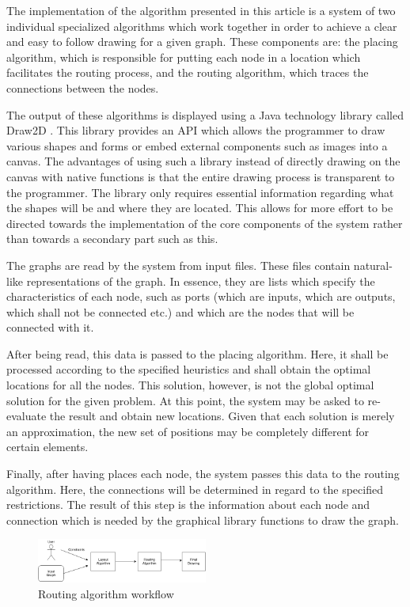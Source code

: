 \label{chap:arch}

The implementation of the algorithm presented in this article is a system of two individual 
specialized algorithms which work together in order to achieve a clear and easy to follow drawing for a given graph.
 These components are: the placing algorithm, which is responsible for putting each node in a location
which facilitates the routing process, and the routing algorithm, which traces the
connections between the nodes. 

The output of these algorithms is displayed using a Java technology library called Draw2D \cite{wurthinger2006visualization}.
This library provides an API which allows the programmer to draw various shapes and forms or
embed external components such as images into a canvas. The advantages of using such a 
library instead of directly drawing on the canvas with native functions is that the entire
drawing process is transparent to the programmer. The library only requires essential 
information regarding what the shapes will be and where they are located. This allows for 
more effort to be directed towards the implementation of the core components of the system
rather than towards a secondary part such as this.

The graphs are read by the system from input files. These files contain natural-like
representations of the graph. In essence, they are lists which specify the characteristics
of each node, such as ports (which are inputs, which are outputs, which shall not be 
connected etc.) and which are the nodes that will be connected with it.

After being read, this data is passed to the placing algorithm. Here, it shall be processed 
according to the specified heuristics and shall obtain the optimal locations for all the
nodes. This solution, however, is not the global optimal solution for the given problem. At 
this point, the system may be asked to re-evaluate the result and obtain new locations. Given
that each solution is merely an approximation, the new set of positions may be completely
different for certain elements.

Finally, after having places each node, the system passes this data to the routing algorithm.
Here, the connections will be determined in regard to the specified restrictions. The result of 
this step is the information about each node and connection which is needed by the graphical
library functions to draw the graph.

\begin{figure}[ht] \centering
\includegraphics[width=0.5\textwidth]{src/systemWorkflow.png}
\caption{Routing algorithm workflow} \end{figure}
